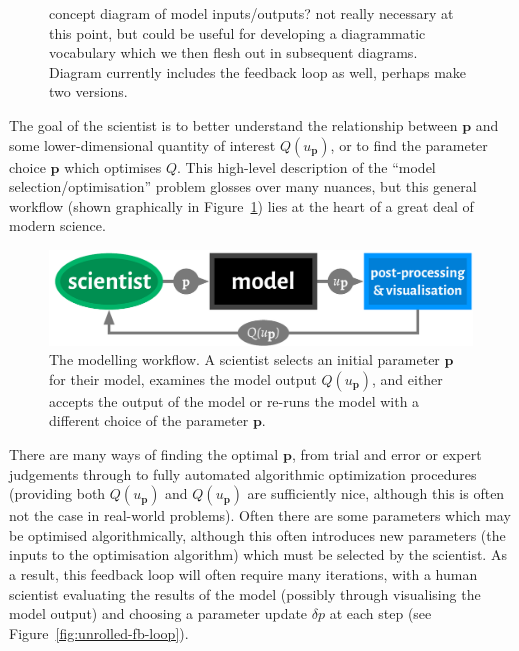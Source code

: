 \documentclass[a4paper,fontsize=12pt]{scrartcl}
\begin{document}
\begin{figure}[h!]
\centering

\caption{concept diagram of model inputs/outputs? not really
  necessary at this point, but could be useful for developing a
  diagrammatic vocabulary which we then flesh out in subsequent
  diagrams. Diagram currently includes the feedback loop as well, 
  perhaps make two versions.}
\end{figure}

The goal of the scientist is to better understand the relationship
between $\mathbf{p}$ and some lower-dimensional quantity of interest
$Q(u_{\mathbf{p}})$, or to find the parameter choice $\mathbf{p}$
which optimises $Q$. %
This high-level description of the ``model selection/optimisation''
problem glosses over many nuances, but this general workflow (shown
graphically in Figure~\ref{fig:general-fb-loop}) lies at the heart of
a great deal of modern science.

\begin{figure}
  \centering
  \includegraphics[width=.75\textwidth]{figures/general-fb-loop.pdf}
  \caption{The modelling workflow. A scientist selects an initial
    parameter $\mathbf{p}$ for their model, examines the model output
    $Q(u_{\mathbf{p}})$, and either accepts the output of the model
    or re-runs the model with a different choice of the parameter
    $\mathbf{p}$.}
  \label{fig:general-fb-loop}
\end{figure}

There are many ways of finding the optimal $\mathbf{p}$, from trial
and error or expert judgements through to fully automated algorithmic
optimization procedures (providing both $Q(u_{\mathbf{p}})$ and
$Q(u_{\mathbf{p}})$ are sufficiently nice, although this is often not
the case in real-world problems). Often there are some parameters
which may be optimised algorithmically, although this often introduces
new parameters (the inputs to the optimisation algorithm) which must
be selected by the scientist. As a result, this feedback loop will
often require many iterations, with a human scientist evaluating the
results of the model (possibly through visualising the model output)
and choosing a parameter update $\delta p$ at each step (see
Figure~\ref{fig:unrolled-fb-loop}).
\end{document}
